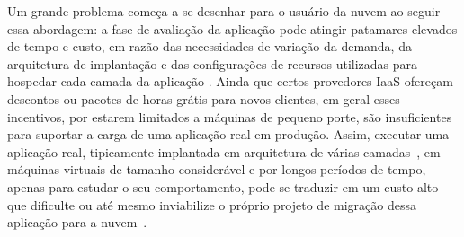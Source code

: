 \documentclass[12pt]{article}
\begin{document}

Um grande problema começa a se desenhar para o usuário da nuvem ao seguir essa abordagem: a fase de avaliação da aplicação pode atingir patamares elevados de tempo e custo, em razão das necessidades de variação da demanda, da arquitetura de implantação e das configurações de recursos utilizadas para hospedar cada camada da aplicação \cite{silva2013cloudbench}. Ainda que certos provedores IaaS ofereçam descontos ou pacotes de horas grátis para novos clientes, em geral esses incentivos, por estarem limitados a máquinas de pequeno porte, são insuficientes para suportar a carga de uma aplicação real em produção. Assim, executar uma aplicação real, tipicamente implantada em arquitetura de várias camadas~\cite{jayasinghe2011variations}, em máquinas virtuais de tamanho considerável e por longos períodos de tempo, apenas para estudar o seu comportamento, pode se traduzir em um custo alto que dificulte ou até mesmo inviabilize o próprio projeto de migração dessa aplicação para a nuvem~\cite{beserra2012cloudstep}. 
\end{document}
